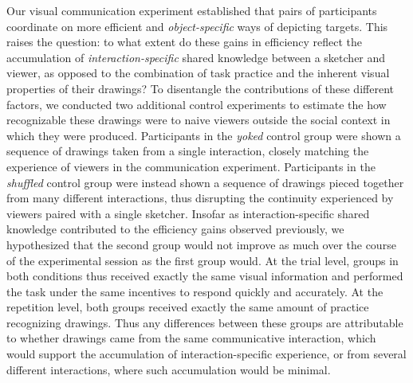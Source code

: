 \documentclass[11pt,letterpaper]{article}
\begin{document}
Our visual communication experiment established that pairs of participants coordinate on more efficient and \emph{object-specific} ways of depicting targets. %
This raises the question: to what extent do these gains in efficiency reflect the accumulation of \emph{interaction-specific} shared knowledge between a sketcher and viewer, as opposed to the combination of task practice and the inherent visual properties of their drawings?
To disentangle the contributions of these different factors, we conducted two additional control experiments to estimate the how recognizable these drawings were to naive viewers outside the social context in which they were produced.
Participants in the \emph{yoked} control group were shown a sequence of drawings taken from a single interaction, closely matching the experience of viewers in the communication experiment.
Participants in the \emph{shuffled} control group were instead shown a sequence of drawings pieced together from many different interactions, thus disrupting the continuity experienced by viewers paired with a single sketcher.
Insofar as interaction-specific shared knowledge contributed to the efficiency gains observed previously, we hypothesized that the second group would not improve as much over the course of the experimental session as the first group would.
At the trial level, groups in both conditions thus received exactly the same visual information and performed the task under the same incentives to respond quickly and accurately.
At the repetition level, both groups received exactly the same amount of practice recognizing drawings.
Thus any differences between these groups are attributable to whether drawings came from the same communicative interaction, which would support the accumulation of interaction-specific experience, or from several different interactions, where such accumulation would be minimal.

\end{document}
